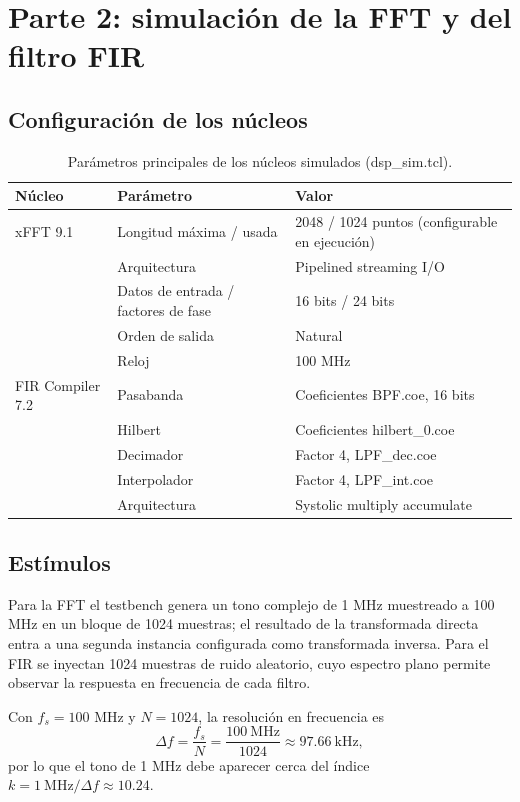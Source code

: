 \documentclass[11pt,a4paper]{article}
\begin{document}
\section{Parte 2: simulación de la FFT y del filtro FIR}
\subsection{Configuración de los núcleos}
\begin{table}[H]\centering
\caption{Parámetros principales de los núcleos simulados (dsp\_sim.tcl).}
\begin{tabular}{lll}\toprule
Núcleo & Parámetro & Valor\\\midrule
xFFT 9.1 & Longitud máxima / usada & 2048 / 1024 puntos (configurable en ejecución)\\
 & Arquitectura & Pipelined streaming I/O\\
 & Datos de entrada / factores de fase & 16 bits / 24 bits\\
 & Orden de salida & Natural\\
 & Reloj & 100 MHz\\\midrule
FIR Compiler 7.2 & Pasabanda & Coeficientes BPF.coe, 16 bits\\
 & Hilbert & Coeficientes hilbert\_0.coe\\
 & Decimador & Factor 4, LPF\_dec.coe\\
 & Interpolador & Factor 4, LPF\_int.coe\\
 & Arquitectura & Systolic multiply accumulate\\\bottomrule
\end{tabular}
\end{table}

\subsection{Estímulos}
Para la FFT el testbench genera un tono complejo de 1 MHz muestreado a 100 MHz en un bloque de 1024 muestras; el resultado de la transformada directa entra a una segunda instancia configurada como transformada inversa. Para el FIR se inyectan 1024 muestras de ruido aleatorio, cuyo espectro plano permite observar la respuesta en frecuencia de cada filtro.

Con $f_s = 100$ MHz y $N = 1024$, la resolución en frecuencia es
\[
\Delta f = \frac{f_s}{N} = \frac{100\ \text{MHz}}{1024} \approx 97.66\ \text{kHz},
\]
por lo que el tono de 1 MHz debe aparecer cerca del índice $k = 1\ \text{MHz}/\Delta f \approx 10.24$.
\end{document}
